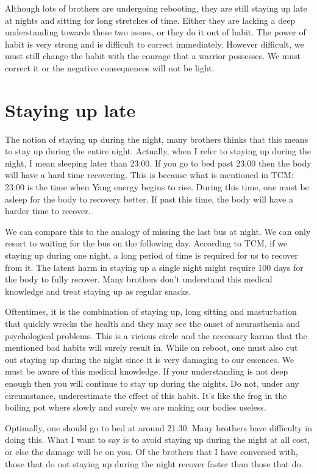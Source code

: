 \documentclass[
]{book}
\begin{document}
Although lots of brothers are undergoing rebooting, they are still staying up late at nights and sitting for long stretches of time. Either they are lacking a deep understanding towards these two issues, or they do it out of habit. The power of habit is very strong and is difficult to correct immediately. However difficult, we must still change the habit with the courage that a warrior possesses. We must correct it or the negative consequences will not be light.

\hypertarget{staying-up-late}{%
\section{Staying up late}\label{staying-up-late}}

The notion of staying up during the night, many brothers thinks that this means to stay up during the entire night. Actually, when I refer to staying up during the night, I mean sleeping later than 23:00. If you go to bed past 23:00 then the body will have a hard time recovering. This is because what is mentioned in TCM: 23:00 is the time when Yang energy begins to rise. During this time, one must be asleep for the body to recovery better. If past this time, the body will have a harder time to recover.

We can compare this to the analogy of missing the last bus at night. We can only resort to waiting for the bus on the following day. According to TCM, if we staying up during one night, a long period of time is required for us to recover from it. The latent harm in staying up a single night might require 100 days for the body to fully recover. Many brothers don't understand this medical knowledge and treat staying up as regular snacks.

Oftentimes, it is the combination of staying up, long sitting and masturbation that quickly wrecks the health and they may see the onset of neurasthenia and psychological problems. This is a vicious circle and the necessary karma that the mentioned bad habits will surely result in. While on reboot, one must also cut out staying up during the night since it is very damaging to our essences. We must be aware of this medical knowledge. If your understanding is not deep enough then you will continue to stay up during the nights. Do not, under any circumstance, underestimate the effect of this habit. It's like the frog in the boiling pot where slowly and surely we are making our bodies useless.

Optimally, one should go to bed at around 21:30. Many brothers have difficulty in doing this. What I want to say is to avoid staying up during the night at all cost, or else the damage will be on you. Of the brothers that I have conversed with, those that do not staying up during the night recover faster than those that do.
\end{document}

